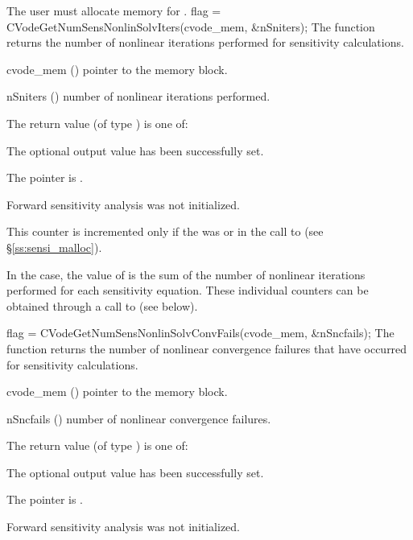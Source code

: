 {
  The user must allocate memory for .
}
{
  flag = CVodeGetNumSensNonlinSolvIters(cvode\_mem, \&nSniters);
}
{
  The function  returns the
  number of nonlinear iterations performed for 
  sensitivity calculations.
}
{
  \begin{args}
  \item[cvode\_mem] ()
    pointer to the {\cvodes} memory block.
  \item[nSniters] ()
    number of nonlinear iterations performed.
  \end{args}
}
{
  The return value  (of type ) is one of:
  \begin{args}
  \item[\Id{CV\_SUCCESS}] 
    The optional output value has been successfully set.
  \item[\Id{CV\_MEM\_NULL}]
    The  pointer is .
  \item[\Id{CV\_NO\_SENS}]
    Forward sensitivity analysis was not initialized.
  \end{args}
}
{
  This counter is incremented only if the  was  or 
   in the call to  (see \S\ref{ss:sensi_malloc}).
  
  In the  case, the value of  is the sum of 
  the number of nonlinear iterations performed for each sensitivity equation.
  These individual counters can be obtained through a call to
   (see below).
}
{
  flag = CVodeGetNumSensNonlinSolvConvFails(cvode\_mem, \&nSncfails);
}
{
  The function  returns the
  number of nonlinear convergence failures that have occurred for
  sensitivity calculations.
}
{
  \begin{args}
  \item[cvode\_mem] ()
    pointer to the {\cvodes} memory block.
  \item[nSncfails] ()
    number of nonlinear convergence failures.
  \end{args}
}
{
  The return value  (of type ) is one of:
  \begin{args}
  \item[\Id{CV\_SUCCESS}] 
    The optional output value has been successfully set.
  \item[\Id{CV\_MEM\_NULL}]
    The  pointer is .
  \item[\Id{CV\_NO\_SENS}]
    Forward sensitivity analysis was not initialized.
  \end{args}
}
